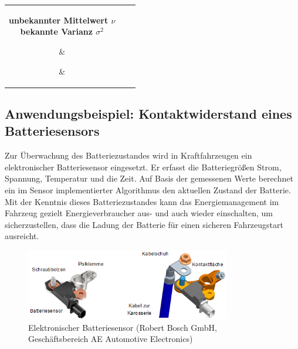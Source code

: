 \begin{table}[H]
{\begin{tabular}{| c | c | c |}
\parbox[c][1.6in][c]{1.2in}{\centering{}\selectfont\textbf{unbekannter Mittelwert $\nu$\newline
\\
bekannte Varianz $\sigma^{2}$}} & 
\parbox[c][1.6in][c]{2.6in}{\centering{}} &
\parbox[c][1.6in][c]{2.6in}{\centering{}}\\
\hline
\end{tabular}%
}
\label{tab:fivetwenty}
\end{table}

\clearpage

\subsection{Anwendungsbeispiel: Kontaktwiderstand eines Batteriesensors}

\noindent Zur \"{U}berwachung des Batteriezustandes wird in Kraftfahrzeugen ein elektronischer Batteriesensor eingesetzt. Er erfasst die Batteriegr\"{o}{\ss}en Strom, Spannung, Temperatur und die Zeit. Auf Basis der gemessenen Werte berechnet ein im Sensor implementierter Algorithmus den aktuellen Zustand der Batterie. Mit der Kenntnis dieses Batteriezustandes kann das Energiemanagement im Fahrzeug gezielt Energieverbraucher aus- und auch wieder einschalten, um sicherzustellen, dass die Ladung der Batterie f\"{u}r einen sicheren Fahrzeugstart ausreicht.

\noindent 
\begin{figure}[H]
  \centerline{\includegraphics[width=0.8\textwidth]{Kapitel5/Bilder/image9}}
  \caption{Elektronischer Batteriesensor (Robert Bosch GmbH, Gesch\"{a}ftsbereich AE Automotive Electronics)}
  \label{fig:Batteriewiderstand1}
\end{figure}

